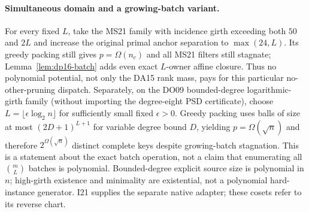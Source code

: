 \documentclass[11pt]{article}
\begin{document}
\paragraph{Simultaneous domain and a growing-batch variant.}
For every fixed $L$, take the MS21 family with incidence girth exceeding both $50$ and $2L$ and increase the original primal anchor separation to $\max(24,L)$. Its greedy packing still gives $p=\Omega(n_c)$ and all MS21 filters still stagnate; Lemma~\ref{lem:dp16-batch} adds even exact $L$-owner affine closure. Thus no polynomial potential, not only the DA15 rank mass, pays for this particular no-other-pruning dispatch. Separately, on the DO09 bounded-degree logarithmic-girth family (without importing the degree-eight PSD certificate), choose $L=\lfloor\epsilon\log_2 n\rfloor$ for sufficiently small fixed $\epsilon>0$. Greedy packing uses balls of size at most $(2D+1)^{L+1}$ for variable degree bound $D$, yielding $p=\Omega(\sqrt n)$ and therefore $2^{\Omega(\sqrt n)}$ distinct complete keys despite growing-batch stagnation. This is a statement about the exact batch operation, not a claim that enumerating all $\binom mL$ batches is polynomial. Bounded-degree explicit source size is polynomial in $n$; high-girth existence and minimality are existential, not a polynomial hard-instance generator. I21 supplies the separate native adapter; these cosets refer to its reverse chart.
\end{document}
